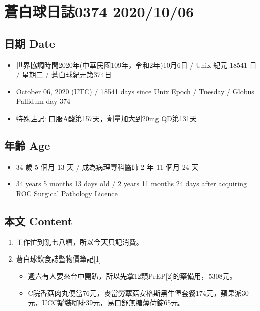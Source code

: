 \documentclass[
]{article}
\providecommand{\tightlist}{%
  \setlength{\itemsep}{0pt}\setlength{\parskip}{0pt}}
\begin{document}
\hypertarget{ux84bcux767dux7403ux65e5ux8a8c0374-20201006}{%
\section{蒼白球日誌0374
2020/10/06}\label{ux84bcux767dux7403ux65e5ux8a8c0374-20201006}}

\hypertarget{ux65e5ux671f-date-5}{%
\subsection{日期 Date}\label{ux65e5ux671f-date-5}}

\begin{itemize}
\tightlist
\item
  世界協調時間2020年(中華民國109年，令和2年)10月6日 / Unix 紀元 18541 日
  / 星期二 / 蒼白球紀元第374日
\item
  October 06, 2020 (UTC) / 18541 days since Unix Epoch / Tuesday /
  Globus Pallidum day 374
\item
  特殊註記: 口服A酸第157天，劑量加大到20mg QD第131天
\end{itemize}

\hypertarget{ux5e74ux9f61-age-5}{%
\subsection{年齡 Age}\label{ux5e74ux9f61-age-5}}

\begin{itemize}
\tightlist
\item
  34 歲 5 個月 13 天 / 成為病理專科醫師 2 年 11 個月 24 天
\item
  34 years 5 months 13 days old / 2 years 11 months 24 days after
  acquiring ROC Surgical Pathology Licence
\end{itemize}

\hypertarget{ux672cux6587-content-5}{%
\subsection{本文 Content}\label{ux672cux6587-content-5}}

\begin{enumerate}
\def\labelenumi{\arabic{enumi}.}
\item
  工作忙到亂七八糟，所以今天只記消費。
\item
  蒼白球飲食誌暨物價筆記{[}1{]}

  \begin{itemize}
  \tightlist
  \item
    週六有人要來台中開趴，所以先拿12顆PrEP{[}2{]}的藥備用，5308元。
  \item
    C院香菇肉丸便當76元，麥當勞蕈菇安格斯黑牛堡套餐174元，蘋果派30元，UCC罐裝咖啡39元，易口舒無糖薄荷錠65元。
  \end{itemize}
\end{enumerate}
\end{document}
